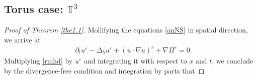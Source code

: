 \documentclass[11pt]{article}
\theoremstyle{plain}\newtheorem{definition}{Definition}[section]
\theoremstyle{definition}\newtheorem{theorem}{Theorem}[section]
\theoremstyle{plain}\newtheorem{lemma}[theorem]{Lemma}
\theoremstyle{plain}\newtheorem{coro}[theorem]{Corollary}
\theoremstyle{plain}\newtheorem{prop}[theorem]{Proposition}
\theoremstyle{remark}\newtheorem{remark}{Remark}[section]
\newcommand{\be}{\begin{equation}}
\newcommand{\ee}{\end{equation}}
\newcommand{\ba}{\begin{aligned}}
\newcommand{\ea}{\end{aligned}}
\numberwithin{equation}{section}
\begin{document}
\subsection{Torus case: $\mathbb{T}^3$}\label{subsec1}
\begin{proof}[Proof of Theorem \ref{the1.1}]


 Mollifying the equations \eqref{anNS}  in spatial direction, we arrive at
\be\ba\label{rmhd}
&\partial_{t}{u^{\varepsilon}}-\Delta_{h} u^\varepsilon +   (u\cdot\nabla u)^{\varepsilon} +\nabla\Pi^{\varepsilon}= 0.
\ea\ee
Multiplying  \eqref{rmhd} by $u^{\varepsilon}$ and integrating it with respect to $x$ and $t$, we conclude by the divergence-free condition and integration by parts that


\end{proof}
\end{document}
